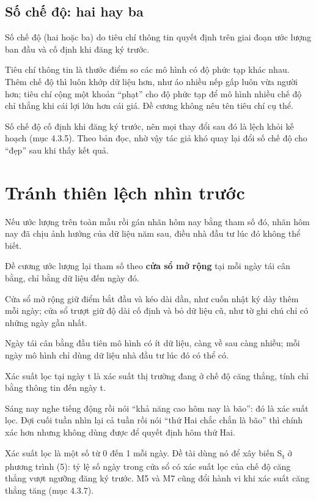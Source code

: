 \subsection{Số chế độ: hai hay ba}

Số chế độ (hai hoặc ba) do tiêu chí thông tin quyết định trên giai đoạn ước lượng ban đầu và cố định khi đăng ký trước.

Tiêu chí thông tin là thước điểm so các mô hình có độ phức tạp khác nhau. Thêm chế độ thì luôn khớp dữ liệu hơn, như áo nhiều nếp gấp luôn vừa người hơn; tiêu chí cộng một khoản “phạt” cho độ phức tạp để mô hình nhiều chế độ chỉ thắng khi cái lợi lớn hơn cái giá. Đề cương không nêu tên tiêu chí cụ thể.

Số chế độ cố định khi đăng ký trước, nên mọi thay đổi sau đó là lệch khỏi kế hoạch (mục 4.3.5). Theo bản đọc, nhờ vậy tác giả khó quay lại đổi số chế độ cho “đẹp” sau khi thấy kết quả.

\section{Tránh thiên lệch nhìn trước}

Nếu ước lượng trên toàn mẫu rồi gán nhãn hôm nay bằng tham số đó, nhãn hôm nay đã chịu ảnh hưởng của dữ liệu năm sau, điều nhà đầu tư lúc đó không thể biết.

Đề cương ước lượng lại tham số theo \textbf{cửa sổ mở rộng} tại mỗi ngày tái cân bằng, chỉ bằng dữ liệu đến ngày đó.

Cửa sổ mở rộng giữ điểm bắt đầu và kéo dài dần, như cuốn nhật ký dày thêm mỗi ngày; cửa sổ trượt giữ độ dài cố định và bỏ dữ liệu cũ, như tờ ghi chú chỉ có những ngày gần nhất.

Ngày tái cân bằng đầu tiên mô hình có ít dữ liệu, càng về sau càng nhiều; mỗi ngày mô hình chỉ dùng dữ liệu nhà đầu tư lúc đó có thể có.

Xác suất lọc tại ngày t là xác suất thị trường đang ở chế độ căng thẳng, tính chỉ bằng thông tin đến ngày t.

Sáng nay nghe tiếng động rồi nói “khả năng cao hôm nay là bão”: đó là xác suất lọc. Đợi cuối tuần nhìn lại cả tuần rồi nói “thứ Hai chắc chắn là bão” thì chính xác hơn nhưng không dùng được để quyết định hôm thứ Hai.

Xác suất lọc là một số từ 0 đến 1 mỗi ngày. Đề tài dùng nó để xây biến S\textsubscript{t} ở phương trình (5): tỷ lệ số ngày trong cửa sổ có xác suất lọc của chế độ căng thẳng vượt ngưỡng đăng ký trước. M5 và M7 cũng đổi hành vi khi xác suất căng thẳng tăng (mục 4.3.7).

